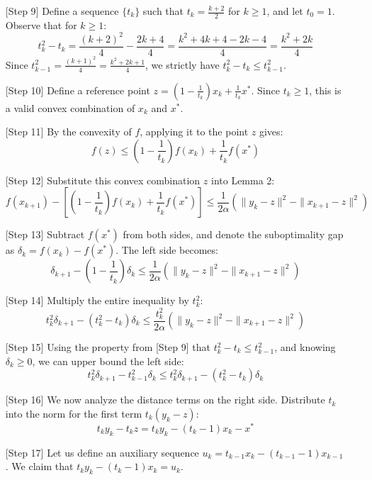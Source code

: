 \documentclass[11pt]{article}
\begin{document}
\begin{itemize}
    \item[{[Step 9]}] Define a sequence $\{t_k\}$ such that $t_k = \frac{k+2}{2}$ for $k \ge 1$, and let $t_0 = 1$. Observe that for $k \ge 1$:
    $$t_k^2 - t_k = \frac{(k+2)^2}{4} - \frac{2k+4}{4} = \frac{k^2+4k+4-2k-4}{4} = \frac{k^2+2k}{4}$$
    Since $t_{k-1}^2 = \frac{(k+1)^2}{4} = \frac{k^2+2k+1}{4}$, we strictly have $t_k^2 - t_k \le t_{k-1}^2$.
    
    \item[{[Step 10]}] Define a reference point $z = \left(1 - \frac{1}{t_k}\right)x_k + \frac{1}{t_k}x^*$. Since $t_k \ge 1$, this is a valid convex combination of $x_k$ and $x^*$.
    
    \item[{[Step 11]}] By the convexity of $f$, applying it to the point $z$ gives:
    $$f(z) \le \left(1 - \frac{1}{t_k}\right)f(x_k) + \frac{1}{t_k}f(x^*)$$
    
    \item[{[Step 12]}] Substitute this convex combination $z$ into Lemma 2:
    $$f(x_{k+1}) - \left[ \left(1 - \frac{1}{t_k}\right)f(x_k) + \frac{1}{t_k}f(x^*) \right] \le \frac{1}{2\alpha} \left( \|y_k - z\|^2 - \|x_{k+1} - z\|^2 \right)$$
    
    \item[{[Step 13]}] Subtract $f(x^*)$ from both sides, and denote the suboptimality gap as $\delta_k = f(x_k) - f(x^*)$. The left side becomes:
    $$\delta_{k+1} - \left(1 - \frac{1}{t_k}\right)\delta_k \le \frac{1}{2\alpha} \left( \|y_k - z\|^2 - \|x_{k+1} - z\|^2 \right)$$
    
    \item[{[Step 14]}] Multiply the entire inequality by $t_k^2$:
    $$t_k^2 \delta_{k+1} - (t_k^2 - t_k)\delta_k \le \frac{t_k^2}{2\alpha} \left( \|y_k - z\|^2 - \|x_{k+1} - z\|^2 \right)$$
    
    \item[{[Step 15]}] Using the property from [Step 9] that $t_k^2 - t_k \le t_{k-1}^2$, and knowing $\delta_k \ge 0$, we can upper bound the left side:
    $$t_k^2 \delta_{k+1} - t_{k-1}^2 \delta_k \le t_k^2 \delta_{k+1} - (t_k^2 - t_k)\delta_k$$
    
    \item[{[Step 16]}] We now analyze the distance terms on the right side. Distribute $t_k$ into the norm for the first term $t_k(y_k - z)$:
    $$t_k y_k - t_k z = t_k y_k - (t_k - 1)x_k - x^*$$
    
    \item[{[Step 17]}] Let us define an auxiliary sequence $u_k = t_{k-1} x_k - (t_{k-1} - 1)x_{k-1}$. We claim that $t_k y_k - (t_k - 1)x_k = u_k$.
    

\end{itemize}
\end{document}
